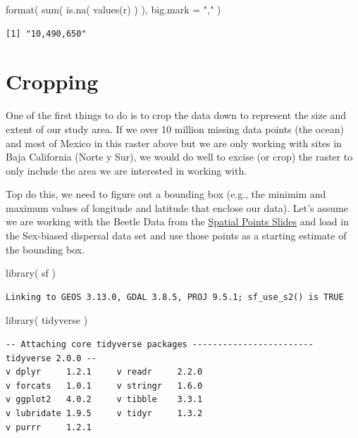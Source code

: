\documentclass[
  letterpaper,
]{book}
\newenvironment{Shaded}{\begin{snugshade}}{\end{snugshade}}
\newcommand{\AttributeTok}[1]{\textcolor[rgb]{0.40,0.45,0.13}{#1}}
\newcommand{\FunctionTok}[1]{\textcolor[rgb]{0.28,0.35,0.67}{#1}}
\newcommand{\NormalTok}[1]{\textcolor[rgb]{0.00,0.23,0.31}{#1}}
\newcommand{\StringTok}[1]{\textcolor[rgb]{0.13,0.47,0.30}{#1}}
\begin{document}
\begin{Shaded}
\begin{Highlighting}[]
\FunctionTok{format}\NormalTok{( }\FunctionTok{sum}\NormalTok{( }\FunctionTok{is.na}\NormalTok{( }\FunctionTok{values}\NormalTok{(r) ) ), }\AttributeTok{big.mark =} \StringTok{","}\NormalTok{ )}
\end{Highlighting}
\end{Shaded}

\begin{verbatim}
[1] "10,490,650"
\end{verbatim}

\section{Cropping}\label{cropping}

One of the first things to do is to crop the data down to represent the
size and extent of our study area. If we over 10 million missing data
points (the ocean) and most of Mexico in this raster above but we are
only working with sites in Baja California (Norte y Sur), we would do
well to excise (or crop) the raster to only include the area we are
interested in working with.

Top do this, we need to figure out a bounding box (e.g., the minimim and
maximum values of longitude and latitude that enclose our data). Let's
assume we are working with the Beetle Data from the
\href{https://dyerlab.github.io/ENVS-Lectures/spatial/spatial_points/slides.html\#1}{Spatial
Points Slides} and load in the Sex-biased dispersal data set and use
those points as a starting estimate of the bounding box.

\begin{Shaded}
\begin{Highlighting}[]
\FunctionTok{library}\NormalTok{( sf )}
\end{Highlighting}
\end{Shaded}

\begin{verbatim}
Linking to GEOS 3.13.0, GDAL 3.8.5, PROJ 9.5.1; sf_use_s2() is TRUE
\end{verbatim}

\begin{Shaded}
\begin{Highlighting}[]
\FunctionTok{library}\NormalTok{( tidyverse )}
\end{Highlighting}
\end{Shaded}

\begin{verbatim}
-- Attaching core tidyverse packages ------------------------ tidyverse 2.0.0 --
v dplyr     1.2.1     v readr     2.2.0
v forcats   1.0.1     v stringr   1.6.0
v ggplot2   4.0.2     v tibble    3.3.1
v lubridate 1.9.5     v tidyr     1.3.2
v purrr     1.2.1     
\end{verbatim}
\end{document}
